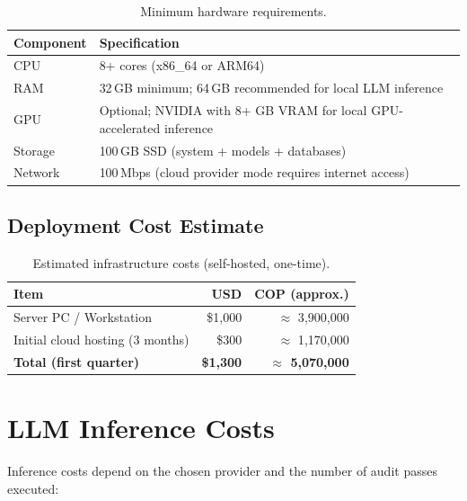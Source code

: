 \documentclass[11pt, a4paper]{article}
\begin{document}
\begin{table}[H]
  \centering
  \caption{Minimum hardware requirements.}
  \label{tab:hardware}
  \renewcommand{\arraystretch}{1.3}
  \begin{tabularx}{\textwidth}{l Y}
    \toprule
    \textbf{Component} & \textbf{Specification} \\
    \midrule
    CPU & 8+ cores (x86\_64 or ARM64) \\
    RAM & 32\,GB minimum; 64\,GB recommended for local LLM inference \\
    GPU & Optional; NVIDIA with 8+ GB VRAM for local GPU-accelerated
      inference \\
    Storage & 100\,GB SSD (system + models + databases) \\
    Network & 100\,Mbps (cloud provider mode requires internet access) \\
    \bottomrule
  \end{tabularx}
\end{table}

\subsection*{Deployment Cost Estimate}

\begin{table}[H]
  \centering
  \caption{Estimated infrastructure costs (self-hosted, one-time).}
  \label{tab:infra-cost}
  \renewcommand{\arraystretch}{1.3}
  \begin{tabularx}{\textwidth}{l r r}
    \toprule
    \textbf{Item} & \textbf{USD} & \textbf{COP (approx.)} \\
    \midrule
    Server PC / Workstation & \$1{,}000 & $\approx$ 3{,}900{,}000 \\
    Initial cloud hosting (3 months) & \$300 & $\approx$ 1{,}170{,}000 \\
    \midrule
    \textbf{Total (first quarter)} & \textbf{\$1{,}300} & \textbf{$\approx$
      5{,}070{,}000} \\
    \bottomrule
  \end{tabularx}
\end{table}

\section{LLM Inference Costs}

Inference costs depend on the chosen provider and the number of audit passes
executed:
\end{document}
